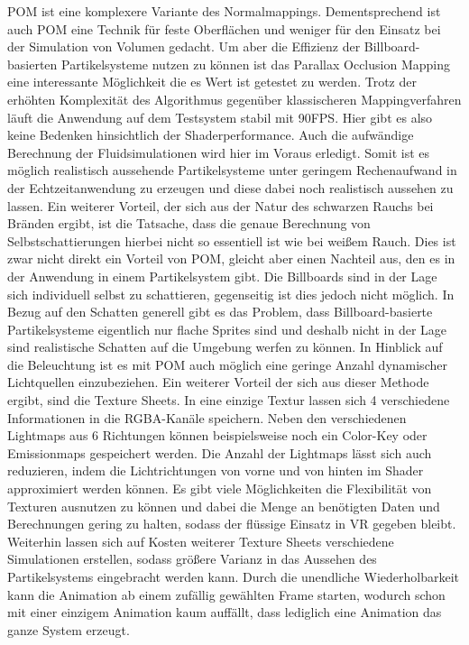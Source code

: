POM ist eine komplexere Variante des Normalmappings. Dementsprechend ist auch POM eine Technik für feste Oberflächen und weniger
für den Einsatz bei der Simulation von Volumen gedacht. Um aber die Effizienz der Billboard-basierten Partikelsysteme 
nutzen zu können ist das Parallax Occlusion Mapping eine interessante Möglichkeit die es Wert ist getestet zu werden. 
Trotz der erhöhten Komplexität des Algorithmus gegenüber klassischeren Mappingverfahren läuft die Anwendung auf dem Testsystem 
stabil mit 90FPS. Hier gibt es also keine Bedenken hinsichtlich der Shaderperformance. Auch die aufwändige Berechnung der 
Fluidsimulationen wird hier im Voraus erledigt. Somit ist es möglich realistisch aussehende Partikelsysteme unter geringem 
Rechenaufwand in der Echtzeitanwendung zu erzeugen und diese dabei noch realistisch aussehen zu lassen. 
Ein weiterer Vorteil, der sich aus der Natur des schwarzen Rauchs bei Bränden ergibt, ist die Tatsache, dass die genaue Berechnung
von Selbstschattierungen hierbei nicht so essentiell ist wie bei weißem Rauch. 
Dies ist zwar nicht direkt ein Vorteil von POM, gleicht aber einen Nachteil aus, den es in der Anwendung in einem Partikelsystem gibt. 
Die Billboards sind in der Lage sich individuell selbst zu schattieren, gegenseitig ist dies jedoch nicht möglich. In Bezug auf den Schatten generell 
gibt es das Problem, dass Billboard-basierte Partikelsysteme eigentlich nur flache Sprites sind und deshalb nicht in der Lage sind realistische Schatten
auf die Umgebung werfen zu können. In Hinblick auf die Beleuchtung ist es mit POM auch möglich eine geringe Anzahl dynamischer Lichtquellen einzubeziehen. 
Ein weiterer Vorteil der sich aus dieser Methode ergibt, sind die Texture Sheets. In eine einzige Textur lassen sich 4 verschiedene Informationen in die 
RGBA-Kanäle speichern. Neben den verschiedenen Lightmaps aus 6 Richtungen können beispielsweise noch ein Color-Key oder Emissionmaps gespeichert werden. 
Die Anzahl der Lightmaps lässt sich auch reduzieren, indem die Lichtrichtungen von vorne und von hinten im Shader approximiert werden können. 
Es gibt viele Möglichkeiten die Flexibilität von Texturen ausnutzen zu können und dabei die Menge an benötigten Daten und Berechnungen gering zu halten, 
sodass der flüssige Einsatz in VR gegeben bleibt. Weiterhin lassen sich auf Kosten weiterer Texture Sheets 
verschiedene Simulationen erstellen, sodass größere Varianz in das Aussehen des Partikelsystems eingebracht werden kann.
Durch die unendliche Wiederholbarkeit kann die Animation ab einem zufällig gewählten Frame starten, wodurch schon mit einer einzigem Animation
kaum auffällt, dass lediglich eine Animation das ganze System erzeugt. 


